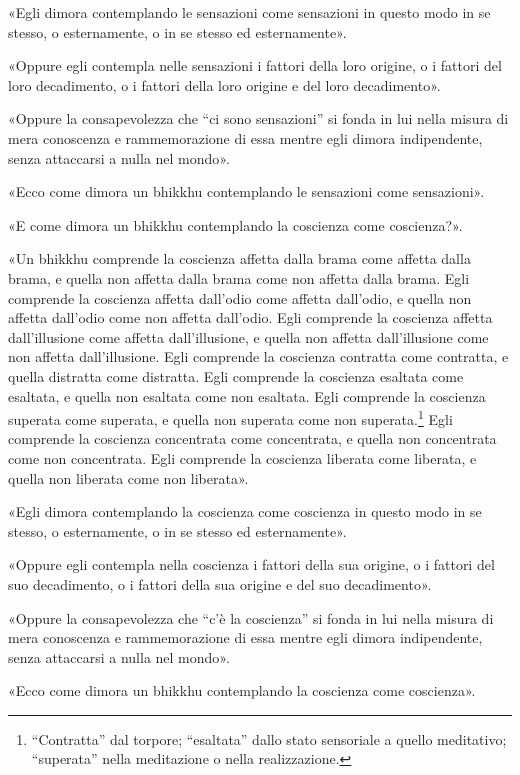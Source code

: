 «Egli dimora contemplando le sensazioni come sensazioni in questo modo
in se stesso, o esternamente, o in se stesso ed esternamente».


«Oppure egli contempla nelle sensazioni i fattori della loro origine, o
i fattori del loro decadimento, o i fattori della loro origine e del
loro decadimento».


«Oppure la consapevolezza che “ci sono sensazioni” si fonda in lui nella
misura di mera conoscenza e rammemorazione di essa mentre egli dimora
indipendente, senza attaccarsi a nulla nel mondo».


«Ecco come dimora un bhikkhu contemplando le sensazioni come
sensazioni».


«E come dimora un bhikkhu contemplando la coscienza come coscienza?».


\label{pag272}«Un bhikkhu comprende la coscienza affetta dalla brama come affetta
dalla brama, e quella non affetta dalla brama come non affetta dalla
brama. Egli comprende la coscienza affetta dall’odio come affetta
dall’odio, e quella non affetta dall’odio come non affetta dall’odio.
Egli comprende la coscienza affetta dall’illusione come affetta
dall’illusione, e quella non affetta dall’illusione come non affetta
dall’illusione. Egli comprende la coscienza contratta come contratta, e
quella distratta come distratta. Egli comprende la coscienza esaltata
come esaltata, e quella non esaltata come non esaltata. Egli comprende
la coscienza superata come superata, e quella non superata come non
superata.\footnote{“Contratta” dal torpore; “esaltata” dallo stato sensoriale a quello meditativo; “superata” nella meditazione o nella realizzazione.}
Egli comprende la coscienza concentrata
come concentrata, e quella non concentrata come non concentrata. Egli
comprende la coscienza liberata come liberata, e quella non liberata
come non liberata».


«Egli dimora contemplando la coscienza come coscienza in questo modo in
se stesso, o esternamente, o in se stesso ed esternamente».


«Oppure egli contempla nella coscienza i fattori della sua origine, o i
fattori del suo decadimento, o i fattori della sua origine e del suo
decadimento».


«Oppure la consapevolezza che “c’è la coscienza” si fonda in lui nella
misura di mera conoscenza e rammemorazione di essa mentre egli dimora
indipendente, senza attaccarsi a nulla nel mondo».


«Ecco come dimora un bhikkhu contemplando la coscienza come coscienza».


